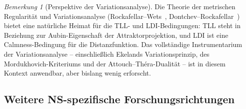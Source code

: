 \documentclass[12pt,a4paper]{article}
\theoremstyle{definition}
\theoremstyle{plain}
\theoremstyle{remark}
\newtheorem{remark}[definition]{Bemerkung}
\begin{document}
\begin{remark}[Perspektive der Variationsanalyse]
\label{rem:variational-analysis}
Die Theorie der metrischen Regularität und Variationsanalyse (Rockafellar--Wets~\cite{RockafellarWets1998}, Dontchev--Rockafellar~\cite{DontchevRockafellar2009}) bietet eine natürliche Heimat für die TLL- und LDI-Bedingungen: TLL steht in Beziehung zur Aubin-Eigenschaft der Attraktorprojektion, und LDI ist eine Calmness-Bedingung für die Distanzfunktion. Das vollständige Instrumentarium der Variationsanalyse -- einschließlich Ekelands Variationsprinzip, des Mordukhovich-Kriteriums und der Attouch--Théra-Dualität -- ist in diesem Kontext anwendbar, aber bislang wenig erforscht.
\end{remark}

\subsection{Weitere NS-spezifische Forschungsrichtungen}
\end{document}
